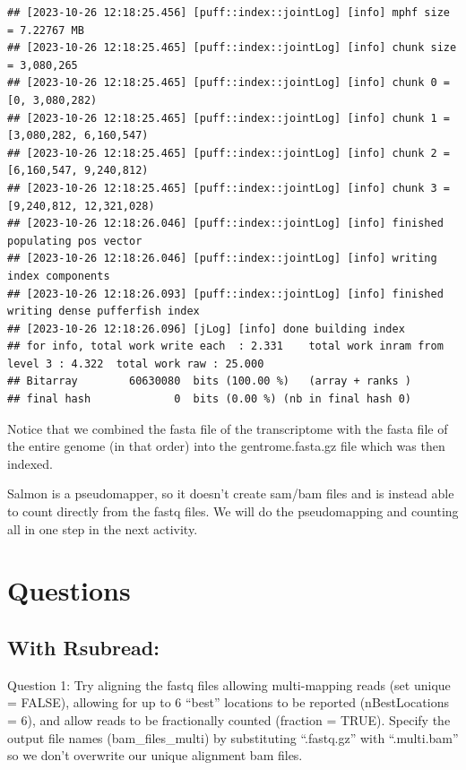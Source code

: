 \documentclass[
]{book}
\begin{document}
\begin{verbatim}
## [2023-10-26 12:18:25.456] [puff::index::jointLog] [info] mphf size = 7.22767 MB
## [2023-10-26 12:18:25.465] [puff::index::jointLog] [info] chunk size = 3,080,265
## [2023-10-26 12:18:25.465] [puff::index::jointLog] [info] chunk 0 = [0, 3,080,282)
## [2023-10-26 12:18:25.465] [puff::index::jointLog] [info] chunk 1 = [3,080,282, 6,160,547)
## [2023-10-26 12:18:25.465] [puff::index::jointLog] [info] chunk 2 = [6,160,547, 9,240,812)
## [2023-10-26 12:18:25.465] [puff::index::jointLog] [info] chunk 3 = [9,240,812, 12,321,028)
## [2023-10-26 12:18:26.046] [puff::index::jointLog] [info] finished populating pos vector
## [2023-10-26 12:18:26.046] [puff::index::jointLog] [info] writing index components
## [2023-10-26 12:18:26.093] [puff::index::jointLog] [info] finished writing dense pufferfish index
## [2023-10-26 12:18:26.096] [jLog] [info] done building index
## for info, total work write each  : 2.331    total work inram from level 3 : 4.322  total work raw : 25.000 
## Bitarray        60630080  bits (100.00 %)   (array + ranks )
## final hash             0  bits (0.00 %) (nb in final hash 0)
\end{verbatim}

Notice that we combined the fasta file of the transcriptome with the fasta file of the entire genome (in that order) into the gentrome.fasta.gz file which was then indexed.

Salmon is a pseudomapper, so it doesn't create sam/bam files and is instead able to count directly from the fastq files. We will do the pseudomapping and counting all in one step in the next activity.

\hypertarget{questions-1}{%
\section{Questions}\label{questions-1}}

\hypertarget{with-rsubread}{%
\subsection{With Rsubread:}\label{with-rsubread}}

Question 1: Try aligning the fastq files allowing multi-mapping reads (set unique = FALSE), allowing for up to 6 ``best'' locations to be reported (nBestLocations = 6), and allow reads to be fractionally counted (fraction = TRUE). Specify the output file names (bam\_files\_multi) by substituting ``.fastq.gz'' with ``.multi.bam'' so we don't overwrite our unique alignment bam files.
\end{document}

